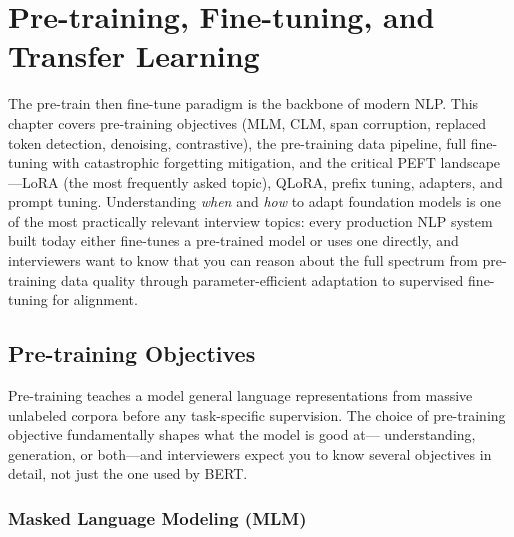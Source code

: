 
\chapter{Pre-training, Fine-tuning, and Transfer Learning}
\label{chap:pretraining_finetuning}

\begin{tldr}
The pre-train then fine-tune paradigm is the backbone of modern NLP.  This chapter
covers pre-training objectives (MLM, CLM, span corruption, replaced token detection,
denoising, contrastive), the pre-training data pipeline, full fine-tuning with
catastrophic forgetting mitigation, and the critical PEFT landscape---LoRA (the most
frequently asked topic), QLoRA, prefix tuning, adapters, and prompt tuning.
Understanding \emph{when} and \emph{how} to adapt foundation models is one of the
most practically relevant interview topics: every production NLP system built today
either fine-tunes a pre-trained model or uses one directly, and interviewers want to
know that you can reason about the full spectrum from pre-training data quality
through parameter-efficient adaptation to supervised fine-tuning for alignment.
\end{tldr}

\bigskip

\section{Pre-training Objectives}
\label{sec:pretraining-objectives}

Pre-training teaches a model general language representations from massive
unlabeled corpora before any task-specific supervision.  The choice of
pre-training objective fundamentally shapes what the model is good at---
understanding, generation, or both---and interviewers expect you to know
several objectives in detail, not just the one used by BERT.

\subsection{Masked Language Modeling (MLM)}

